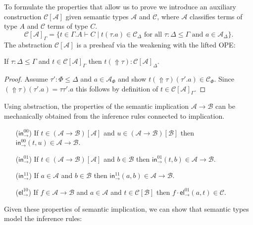 \documentclass[a4paper,USenglish,cleveref, autoref, thm-restate]{lipics-v2019}
\makeatletter
\def\namedlabel#1#2{\begingroup
    #2%
    \def\@currentlabel{#2}%
    \phantomsection\label{#1}\endgroup
}
\newcommand{\tin}{\ensuremath{\mathsf{in}}}
\newcommand{\inn}[2]{\ensuremath{\tin_{#1}^{#2}}}
\newcommand{\tel}{\mathsf{el}}
\newcommand{\el}[2]{\ensuremath{\tel_{#1}^{#2}}}
\newcommand{\A}{\mathcal{A}}
\newcommand{\B}{\mathcal{B}}
\newcommand{\C}{\mathcal{C}}
\newcommand{\Up}{\mathop{\Uparrow}}
\makeatother
\begin{document}
To formulate the properties that allow us to prove  we
introduce an auxiliary construction $\C[\A]$ %
given semantic types $\A$ and $\C$, where $\A$ classifies terms of
type $A$ and $\C$ terms of type $C$.
\[
  \C[\A]_\Gamma =
  \{ t \in \Gamma.A \vdash C
     \mid t(\tau.a) \in \C_\Delta
     \mbox{ for all } \tau : \Delta \leq \Gamma
     \mbox{ and } a \in \A_\Delta
  \}
  .
\]
The abstraction $\C[\A]$ is a presheaf via the weakening with the
lifted OPE:
\begin{lemma}
  If $\tau : \Delta \leq \Gamma$ and $t \in \C[\A]_\Gamma$ then
  $t(\Up\tau) : \C[\A]_\Delta$.
\end{lemma}
\begin{proof}
  Assume $\tau' : \Phi \leq \Delta$ and $a \in \A_\Phi$ and show
  $t(\Up\tau)(\tau'.a) \in \C_\Phi$.  Since $(\Up\tau)(\tau'.a) =
  \tau\tau'.a$ this follows by definition of $t \in \C[\A]_\Gamma$.
\end{proof}

Using abstraction, the properties of the semantic implication $\A \to
\B$ can be mechanically obtained from the inference rules connected to
implication.
\begin{itemize}[leftmargin=3em]

\item[\namedlabel{it:in00}{(\inn\to{00})}]
  If $t \in (\A \to \B)[\A]$ and $u \in (\A \to \B)[\B]$ then
  $\inn\to{00}(t,u) \in \A \to \B$.

\item[\namedlabel{it:in01}{(\inn\to{01})}]
  If $t \in (\A \to \B)[\A]$ and $b \in \B$ then
  $\inn\to{01}(t,b) \in \A \to \B$.

\item[\namedlabel{it:in11}{(\inn\to{11})}]
  If $a \in \A$ and $b \in \B$ then $\inn\to{11}(a,b) \in \A \to \B$.

\item[\namedlabel{it:el10}{(\el\to{10})}]
  If $f \in \A \to \B$ and $a \in \A$ and $t \in \C[\B]$ then
  $f \cdot \el\to{01}(a,t) \in \C$.

\end{itemize}

Given these properties of semantic implication, we can show that
semantic types model the inference rules:
\end{document}
